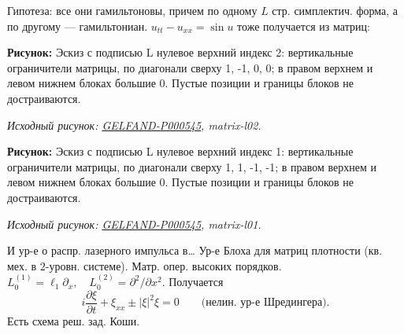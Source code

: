 \documentclass[11pt]{article}
\theoremstyle{definition}
\theoremstyle{remark}
\newcommand{\SourceFigure}[3]{%
  \par\begingroup\color{blue!60!black}\textbf{\hyperref[#1:source-page]{Source figure #1/#2}:} #3%
  \par\textit{Consult the authoritative scan at this locator.}\endgroup\par%
}
\renewcommand{\SourceFigure}[3]{%
  \par\begingroup\color{blue!55!black}\textbf{Рисунок:} #3%
  \par{\small\textit{Исходный рисунок: \hyperref[#1:source-page]{#1}, #2.}}%
  \endgroup\par%
}
\begin{document}
Гипотеза: все они гамильтоновы, причем по одному $L$ стр. симплектич. форма,
а по другому — гамильтониан.
$u_{tt}-u_{xx}=\sin u$ тоже получается из матриц:
\SourceFigure{GELFAND-P000545}{matrix-l02}{Эскиз с подписью L нулевое верхний индекс 2: вертикальные ограничители матрицы, по диагонали сверху 1, -1, 0, 0; в правом верхнем и левом нижнем блоках большие 0. Пустые позиции и границы блоков не достраиваются.}
\SourceFigure{GELFAND-P000545}{matrix-l01}{Эскиз с подписью L нулевое верхний индекс 1: вертикальные ограничители матрицы, по диагонали сверху 1, 1, -1, -1; в правом верхнем и левом нижнем блоках большие 0. Пустые позиции и границы блоков не достраиваются.}
И ур-е о распр. лазерного импульса в…
Ур-е Блоха для матриц плотности (кв. мех. в $2$-уровн. системе).
Матр. опер. высоких порядков.
$L_0^{(1)}=\ell_1\partial_x,\quad L_0^{(2)}=\partial^2/\partial x^2$.
Получается
\begin{equation*}
i\frac{\partial\xi}{\partial t}+\xi_{xx}\pm|\xi|^2\xi=0
\qquad\text{(нелин. ур-е Шредингера)}.
\end{equation*}
Есть схема реш. зад. Коши.
\end{document}
